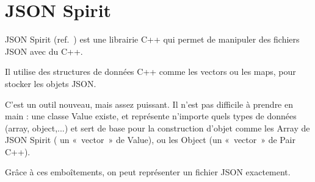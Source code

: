 \section{JSON Spirit}
JSON Spirit (ref.~\cite{JsonSpirit}) est une librairie C++ qui permet de manipuler des fichiers JSON avec du C++.

Il utilise des structures de données C++ comme les vectors ou les maps, pour stocker les objets JSON. 

C'est un outil nouveau, mais assez puissant. Il n'est pas difficile à prendre en main : une classe Value existe, et représente n'importe quels types de données (array, object,...) et sert de base pour la construction d'objet comme les Array de JSON Spirit ( un «~vector~» de Value), ou les Object (un «~vector~» de Pair C++).

Grâce à ces emboîtements, on peut représenter un fichier JSON exactement.
